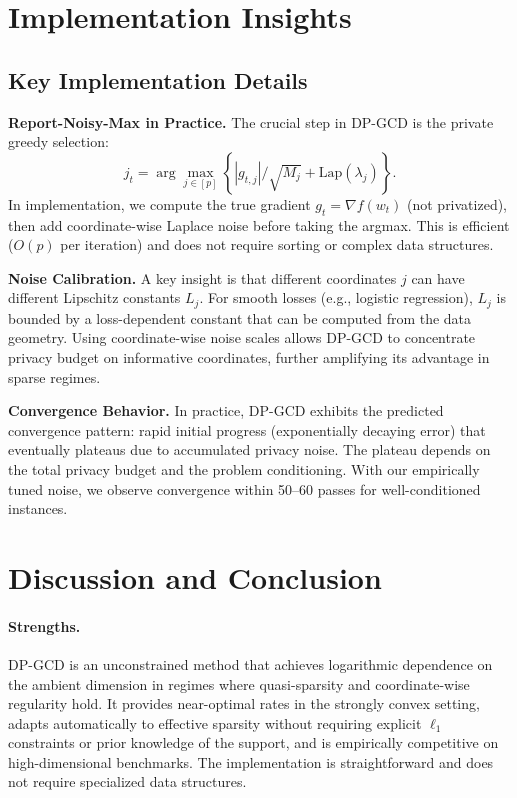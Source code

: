 \documentclass[11pt,a4paper]{article}
\begin{document}
\section{Implementation Insights}

\subsection{Key Implementation Details}

\textbf{Report-Noisy-Max in Practice.} The crucial step in DP-GCD is the private greedy selection:
\[
j_t = \arg\max_{j \in [p]} \left\{ |g_{t,j}|/\sqrt{M_j} + \mathrm{Lap}(\lambda_j) \right\}.
\]
In implementation, we compute the true gradient $g_t = \nabla f(w_t)$ (not privatized), then add coordinate-wise Laplace noise before taking the argmax. This is efficient ($O(p)$ per iteration) and does not require sorting or complex data structures.

\textbf{Noise Calibration.} A key insight is that different coordinates $j$ can have different Lipschitz constants $L_j$. For smooth losses (e.g., logistic regression), $L_j$ is bounded by a loss-dependent constant that can be computed from the data geometry. Using coordinate-wise noise scales allows DP-GCD to concentrate privacy budget on informative coordinates, further amplifying its advantage in sparse regimes.

\textbf{Convergence Behavior.} In practice, DP-GCD exhibits the predicted convergence pattern: rapid initial progress (exponentially decaying error) that eventually plateaus due to accumulated privacy noise. The plateau depends on the total privacy budget and the problem conditioning. With our empirically tuned noise, we observe convergence within 50--60 passes for well-conditioned instances.

\section{Discussion and Conclusion}

\paragraph{Strengths.}
DP-GCD is an unconstrained method that achieves logarithmic dependence on the ambient dimension in regimes where quasi-sparsity and coordinate-wise regularity hold. It provides near-optimal rates in the strongly convex setting, adapts automatically to effective sparsity without requiring explicit $\ell_1$ constraints or prior knowledge of the support, and is empirically competitive on high-dimensional benchmarks. The implementation is straightforward and does not require specialized data structures.
\end{document}
